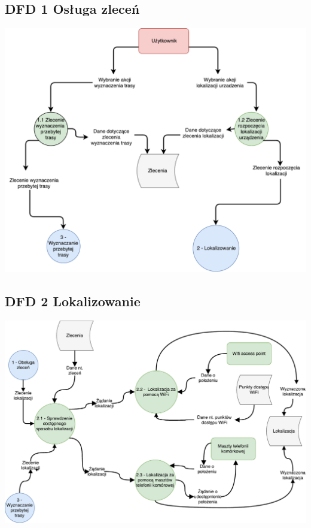 \documentclass[11pt]{article}
\begin{document}
	\subsection{DFD 1 Osługa zleceń}
	\begin{center}
		\includegraphics[scale=0.7]{DFD1.pdf}
	\end{center}
	\subsection{DFD 2 Lokalizowanie}
	\begin{center}
		\includegraphics[scale=0.6]{DFD2.pdf}
	\end{center}
	\newpage
\end{document}
